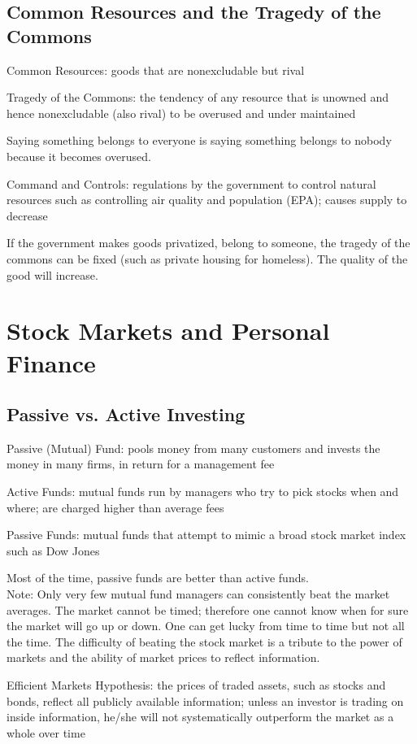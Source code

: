 \documentclass[12pt]{article}
\begin{document}
\subsection{Common Resources and the Tragedy of the Commons}
\begin{definition} Common Resources: goods that are nonexcludable but rival \end{definition}
\begin{definition} Tragedy of the Commons: the tendency of any resource that is unowned and hence nonexcludable (also rival) to be overused and under maintained \end{definition}
Saying something belongs to everyone is saying something belongs to nobody because it becomes overused. 
\begin{definition} Command and Controls: regulations by the government to control natural resources such as controlling air quality and population (EPA); causes supply to decrease \end{definition}
If the government makes goods privatized, belong to someone, the tragedy of the commons can be fixed (such as private housing for homeless). The quality of the good will increase. 


\section{Stock Markets and Personal Finance} 
\subsection{Passive vs. Active Investing}
\begin{definition} Passive (Mutual) Fund: pools money from many customers and invests the money in many firms, in return for a management fee \end{definition} 
\begin{definition} Active Funds: mutual funds run by managers who try to pick stocks when and where; are charged higher than average fees \end{definition} 
\begin{definition} Passive Funds: mutual funds that attempt to mimic a broad stock market index such as Dow Jones \end{definition}
Most of the time, passive funds are better than active funds. \\ 
Note: Only very few mutual fund managers can consistently beat the market averages. 
The market cannot be timed; therefore one cannot know when for sure the market will go up or down. One can get lucky from time to time but not all the time. The difficulty of beating the stock market is a tribute to the power of markets and the ability of market prices to reflect information. 
\begin{definition} Efficient Markets Hypothesis: the prices of traded assets, such as stocks and bonds, reflect all publicly available information; unless an investor is trading on inside information, he/she will not systematically outperform the market as a whole over time \end{definition}
\end{document}
